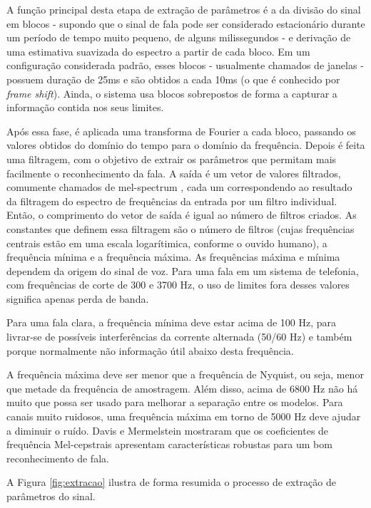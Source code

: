 \documentclass[12pt,a4paper,oneside]{report}
\begin{document}
A função principal desta etapa de extração de parâmetros é a da divisão do sinal em blocos - supondo que o sinal de fala pode ser considerado estacionário durante um período de tempo muito pequeno, de alguns milissegundos - e derivação de uma estimativa suavizada do espectro a partir de cada bloco. Em um configuração considerada padrão,
esses blocos - usualmente chamados de janelas - possuem duração de 25ms e são obtidos a cada 10ms (o que é conhecido por \emph{frame shift}). Ainda, o sistema usa blocos sobrepostos de forma a capturar a informação contida nos seus limites.

Após essa fase, é aplicada uma transforma de Fourier a cada bloco, passando os valores obtidos do domínio do tempo para o domínio da frequência.
Depois é feita uma filtragem, com o objetivo de extrair os parâmetros que permitam mais facilmente o reconhecimento da fala. A saída é um vetor de valores filtrados, comumente chamados de mel-spectrum \cite{Cepstrum}, cada um correspondendo ao resultado da filtragem do espectro de frequências da entrada por um filtro individual. Então, o comprimento do vetor de saída é igual ao número de filtros criados.
As constantes que definem essa filtragem são o número de filtros (cujas frequências centrais estão em uma escala logarítimica, conforme o ouvido humano), a frequência mínima e a frequência máxima.
As frequências máxima e mínima dependem da origem do sinal de voz. Para uma fala em um sistema de telefonia, com frequências de corte de 300 e 3700 Hz, o uso de limites fora desses valores significa apenas perda de banda.

Para uma fala clara, a frequência mínima deve estar acima de 100 Hz, para livrar-se de possíveis interferências da corrente alternada (50/60 Hz) e também porque normalmente não informação útil abaixo desta frequência.

A frequência máxima deve ser menor que a frequência de Nyquist, ou seja, menor que metade da frequência de amostragem. Além disso, acima de 6800 Hz não há muito que possa ser usado para melhorar a separação entre os modelos. Para canais muito ruidosos, uma frequência máxima em torno de 5000 Hz deve ajudar a diminuir o ruído.
Davis e Mermelstein \cite{davis-mermelstein} mostraram que os coeficientes de frequência Mel-cepstrais apresentam características robustas para um bom reconhecimento de fala.

A Figura \ref{fig:extracao} ilustra de forma resumida o processo de extração de parâmetros do sinal.
\end{document}
